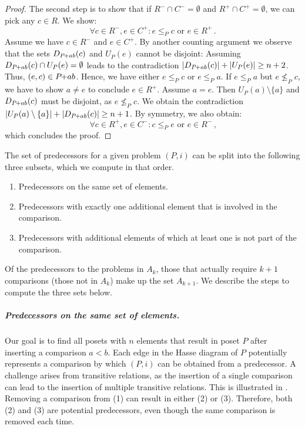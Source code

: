 \documentclass[a4paper,UKenglish,cleveref, autoref, thm-restate]{lipics-v2021}
\newcommand{\pchild}[3]{{#1}\kern-1pt{+}{#2}{#3}}
\newcommand{\less}[2]{D_{#1}(#2)}
\newcommand{\greater}[2]{U_{#1}(#2)}
\begin{document}
\begin{proof}
  The second step is to show that if $R^- \cap C^- = \emptyset$ and $R^+ \cap C^+ = \emptyset$, we can pick any $c \in R$.
  We show:
  \begin{equation}
    \forall c \in R^-, e \in C^+ \colon e \le_P c \text{ or } e \in R^+\,\text{.}
  \end{equation}
  Assume we have $c \in R^-$ and $e \in C^+$.
  By another counting argument we observe that the sets $\less{\pchild{P}{a}{b}}{c}$ and $\greater{P}{e}$ cannot be disjoint:
  Assuming $\less{\pchild{P}{a}{b}}{c} \cap \greater{P}{e} = \emptyset$ leads to the contradiction $|\less{\pchild{P}{a}{b}}{c}| + |\greater{P}{e}| \ge n + 2$.
  Thus, $(e, c) \in \pchild{P}{a}{b}$.
  Hence, we have either $e \le_P c$ or $e \le_P a$.
  If $e \le_P a$ but $e \not\le_P c$, we have to show $a \neq e$ to conclude $e \in R^+$.
  Assume $a = e$.
  Then $\greater{P}{a} \setminus \{ a \}$ and $\less{\pchild{P}{a}{b}}{c}$ must be disjoint, as $e \not\le_P c$.
  We obtain the contradiction $|\greater{P}{a} \setminus \{ a \}| + |\less{\pchild{P}{a}{b}}{c}| \ge n + 1$.
  By symmetry, we also obtain:
  \begin{equation}
    \forall c \in R^+, e \in C^- \colon c \le_P e \text{ or } e \in R^-\,\text{,}
  \end{equation}
  which concludes the proof.
\end{proof}

The set of predecessors for a given problem $(P, i)$ can be split into the following three subsets, which we compute in that order.
\begin{enumerate}
  \item Predecessors on the same set of elements.
  \item Predecessors with exactly one additional element that is involved in the comparison.
  \item Predecessors with additional elements of which at least one is not part of the comparison.
\end{enumerate}
Of the predecessors to the problems in $A_k$, those that actually require $k+1$ comparisons (those not in $A_k$) make up the set $A_{k+1}$.
We describe the steps to compute the three sets below.

\subparagraph{Predecessors on the same set of elements.}
Our goal is to find all posets with $n$ elements that result in poset $P$ after inserting a comparison $a < b$.
Each edge in the Hasse diagram of $P$ potentially represents a comparison by which $(P, i)$ can be obtained from a predecessor.
A challenge arises from transitive relations, as the insertion of a single comparison can lead to the insertion of multiple transitive relations.
This is illustrated in .
Removing a comparison from (1) can result in either (2) or (3).
Therefore, both (2) and (3) are potential predecessors, even though the same comparison is removed each time.
\end{document}
